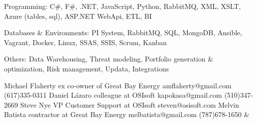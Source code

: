 

\begin{cvitems}
    \item{\fontsize{11pt}{1.5em}\bodyfont Programming: {\fontsize{10pt}{1.0em}\bodyfontlight C\#, F\#, .NET, JavaScript, Python, RabbitMQ, XML, XSLT, Azure (tables, sql), ASP.NET WebApi, ETL, BI}}
	\item{\fontsize{11pt}{1.5em}\bodyfont Databases \& Environments: {\fontsize{10pt}{1.0em}\bodyfontlight PI System, RabbitMQ, SQL, MongoDB, Ansible, Vagrant, Docker, Linux, SSAS, SSIS, Scrum, Kanban}}
	\item{\fontsize{11pt}{1.5em}\bodyfont Others: {\fontsize{10pt}{1.0em}\bodyfontlight Data Warehousing, Threat modeling, Portfolio generation \& optimization, Risk management, Updata, Integrations}}
\end{cvitems}


\begin{creferences}
	 {Michael Flaherty} {ex co-owner of Great Bay Energy} {amflaherty@gmail.com} {(617)335-0311}
	 {Daniel L\'azaro} {colleague at OSIsoft} {kapokasa@gmail.com} {(510)347-2669}
	 {Steve Nye} {VP Customer Support at OSIsoft} {steven@osisoft.com} {}
	 {Melvin Batista} {contractor at Great Bay Energy} {melbatista@gmail.com} {(787)678-1650}
	 &
		 \\
\end{creferences}

